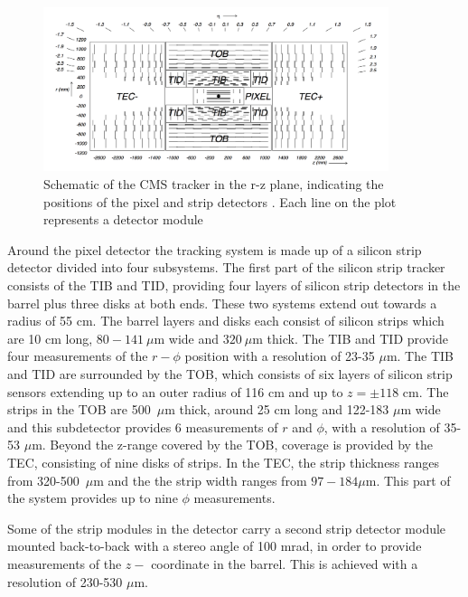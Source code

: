 \begin{figure}[h!]
\begin{center}
\includegraphics[width=0.9\textwidth]{./Detector/Plots/Tracker.png}
\caption{Schematic of the CMS tracker in the r-z plane, indicating the
positions of the pixel and strip detectors \cite{cms-jinst}. Each line 
on the plot represents a detector module}
\label{fig:CMS_tracker}
\end{center}
\end{figure}


Around the pixel detector the tracking system is made up of a silicon
strip detector divided into four subsystems. The first part of the
silicon strip tracker consists of the \ac{TIB} and \ac{TID}, providing four layers of
silicon strip detectors in the barrel plus three disks at both ends. These two systems
extend out towards a radius of 55 cm. The barrel layers and disks each consist
of silicon strips which are 10 cm long, $80-141~\mu$m wide and $320~\mu$m thick. The \ac{TIB} and \ac{TID}
provide four measurements of the $r-\phi$ position  with a resolution of 23-35 $\mu$m.
The \ac{TIB} and \ac{TID} are surrounded by the \ac{TOB}, which consists of six layers of silicon strip sensors extending
up to an outer radius of 116 cm and up to $z=\pm 118$ cm. The strips in the \ac{TOB} are 500~$\mu$m thick, around 25 cm long and 122-183 $\mu$m 
wide and this subdetector provides 6 measurements of $r$ and $\phi$, with a resolution
of 35-53 $\mu$m. Beyond the z-range covered by the \ac{TOB}, coverage is provided by the \ac{TEC},
consisting of nine disks of strips. In the \ac{TEC}, the strip thickness ranges from \mbox{320-500 $\mu$m} and the the strip width ranges from $97-184 \mu$m.
This part of the system provides up to nine $\phi$ measurements.

Some of the strip modules in the detector carry a second strip detector module mounted back-to-back with a stereo angle %
of 100 mrad, in order to provide measurements of the $z-$ coordinate in the barrel. This is achieved with a resolution of 230-530 $\mu$m.

